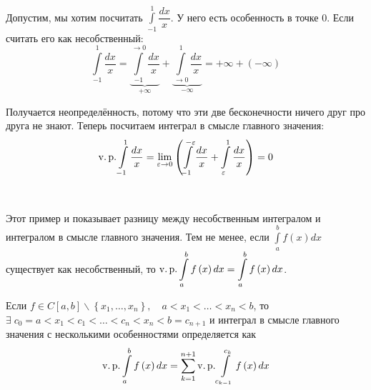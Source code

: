 \documentclass[../main.tex]{subfiles}
\begin{document}
\begin{example}
    
    ~

    Допустим, мы хотим посчитать \( \displaystyle\int\limits_{ -1}^{ 1} \dfrac{ dx}{ x} \). У него есть особенность в точке 0. Если считать его как несобственный:
    \[ \displaystyle\int\limits_{ -1}^{ 1} \dfrac{ dx}{ x} = \underbrace{\displaystyle\int\limits_{ -1}^{ \rightarrow 0} \dfrac{ dx}{ x}}_{+ \infty } + \underbrace{\displaystyle\int\limits_{ \rightarrow 0}^{ 1} \dfrac{ dx}{ x}}_{- \infty }= + \infty + (- \infty ) \]

    Получается неопределённость, потому что эти две бесконечности ничего друг про друга не знают. Теперь посчитаем интеграл в смысле главного значения: 
    \[ \operatorname{v.p.} \displaystyle\int\limits_{ -1}^{ 1} \dfrac{ dx}{ x} = \lim\limits_{ \varepsilon \rightarrow 0} \left( \displaystyle\int\limits_{ -1}^{ -\varepsilon } \dfrac{ dx}{ x}  + \displaystyle\int\limits_{ \varepsilon }^{ 1} \dfrac{ dx}{ x}  \right)=0\]
\end{example}

\begin{note}
    
    ~

    Этот пример и показывает разницу между несобственным интегралом и интегралом в смысле главного значения. Тем не менее, если \( \displaystyle\int\limits_{ a}^{ b}f\left( x\right)dx \) существует как несобственный, то 
    \( \operatorname{v.p.} \displaystyle\int\limits_{ a}^{ b} f\left( x\right)dx= \displaystyle\int\limits_{ a}^{ b} f\left( x\right)dx\).
\end{note}

Если \( f \in C\left[ a,b\right] \backslash \left\{ x_1, \ldots , x_n\right\},\quad a<x_1< \ldots <x_n<b\), то \\
\( \exists \; c_0=a<x_1<c_1< \ldots <c_n<x_n<b=c_{n+1}\) и интеграл в смысле главного значения с несколькими особенностями определяется как 
\[ \operatorname{v.p.} \displaystyle\int\limits_{ a}^{ b} f\left( x\right)dx= \sum\limits_{ k=1}^{ n+1} \operatorname{v.p.} \displaystyle\int\limits_{ c_{k-1}}^{ c_k} f\left( x\right)dx\]
\end{document}
